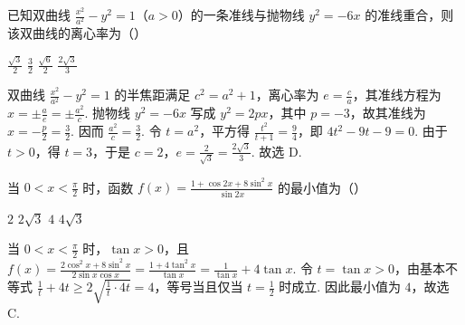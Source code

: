 \begin{problem}
已知双曲线 \(\frac{x^2}{a^2} - y^2 = 1\)（\(a > 0\)）的一条准线与抛物线 \(y^2 = -6x\) 的准线重合，则该双曲线的离心率为（\quad）

\choices
    {\(\frac{\sqrt{3}}{2}\)}
    {\(\frac{3}{2}\)}
    {\(\frac{\sqrt{6}}{2}\)}
    {\(\frac{2\sqrt{3}}{3}\)}

\begin{solution}
双曲线 \(\displaystyle\frac{x^{2}}{a^{2}}-y^{2}=1\) 的半焦距满足 \(c^{2}=a^{2}+1\)，离心率为 \(e=\frac{c}{a}\)，其准线方程为 \(x=\pm\frac{a}{e}=\pm\frac{a^{2}}{c}\). 抛物线 \(y^{2}=-6x\) 写成 \(y^{2}=2px\)，其中 \(p=-3\)，故其准线为 \(x=-\frac p2=\frac32\). 因而
\(\displaystyle\frac{a^{2}}{c}=\frac32\). 令 \(t=a^{2}\)，平方得 \(\displaystyle\frac{t^{2}}{t+1}=\frac94\)，即 \(4t^{2}-9t-9=0\). 由于 \(t>0\)，得 \(t=3\)，于是 \(c=2\)，\(e=\frac{2}{\sqrt3}=\frac{2\sqrt3}{3}\). 故选 D.
\end{solution}
\end{problem}

\begin{problem}
当 \(0 < x < \frac{\pi}{2}\) 时，函数 \(f(x) = \frac{1 + \cos 2x + 8\sin^2 x}{\sin 2x}\) 的最小值为（\quad）

\choices
    {\(2\)}
    {\(2\sqrt{3}\)}
    {\(4\)}
    {\(4\sqrt{3}\)}

\begin{solution}
当 \(0<x<\frac\pi2\) 时，\(\tan x>0\)，且
\(\displaystyle f(x)=\frac{2\cos^{2}x+8\sin^{2}x}{2\sin x\cos x}=\frac{1+4\tan^{2}x}{\tan x}=\frac1{\tan x}+4\tan x\).
令 \(t=\tan x>0\)，由基本不等式
\(\displaystyle\frac1t+4t\geqslant2\sqrt{\frac1t\cdot4t}=4\)，等号当且仅当 \(t=\frac12\) 时成立. 因此最小值为 \(4\)，故选 C.
\end{solution}
\end{problem}

